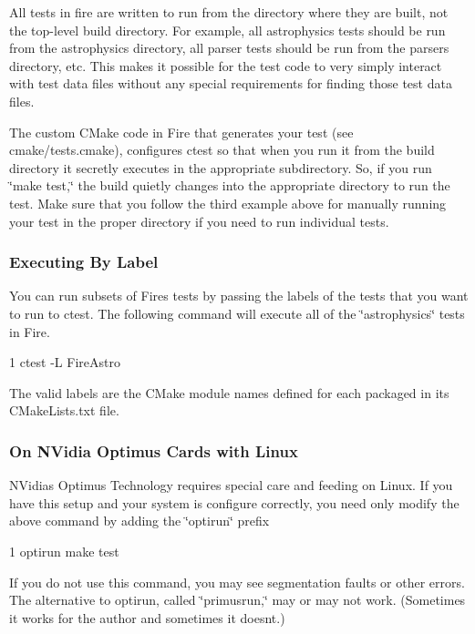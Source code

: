 All tests in fire are written to run from the directory where they are built, not the top-\/level build directory. For example, all astrophysics tests should be run from the astrophysics directory, all parser tests should be run from the parsers directory, etc. This makes it possible for the test code to very simply interact with test data files without any special requirements for finding those test data files.

The custom C\+Make code in Fire that generates your test (see cmake/tests.\+cmake), configures ctest so that when you run it from the build directory it secretly executes in the appropriate subdirectory. So, if you run \char`\"{}make test,\char`\"{} the build quietly changes into the appropriate directory to run the test. Make sure that you follow the third example above for manually running your test in the proper directory if you need to run individual tests.

\subsubsection*{Executing By Label}

You can run subsets of Fire\textquotesingle{}s tests by passing the labels of the tests that you want to run to ctest. The following command will execute all of the \char`\"{}astrophysics\char`\"{} tests in Fire.


\begin{DoxyCode}
1 ctest -L FireAstro
\end{DoxyCode}


The valid labels are the C\+Make module names defined for each packaged in its C\+Make\+Lists.\+txt file.

\subsubsection*{On N\+Vidia Optimus Cards with Linux}

N\+Vidia\textquotesingle{}s Optimus Technology requires special care and feeding on Linux. If you have this setup and your system is configure correctly, you need only modify the above command by adding the \char`\"{}optirun\char`\"{} prefix


\begin{DoxyCode}
1 optirun make test
\end{DoxyCode}


If you do not use this command, you may see segmentation faults or other errors. The alternative to optirun, called \char`\"{}primusrun,\char`\"{} may or may not work. (Sometimes it works for the author and sometimes it doesn\textquotesingle{}t.)

